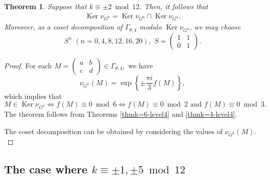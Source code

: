 \documentclass[12pt]{article}
\theoremstyle{definition}
\newtheorem{theorem}{Theorem}
\numberwithin{equation}{section}
\numberwithin{theorem}{section}
\newcommand{\Ker}{\operatorname{Ker}}
\begin{document}
\begin{theorem}
\label{thmk=2-level4}
{\it
Suppose that 
$k\equiv \pm2 \bmod{12}$. 
Then, it follows that 
\begin{align*}
\Ker \nu_{G^{k}}
=
\Ker 
\nu_{ G^{6} }
\cap
\Ker \nu_{ G^4 }. 
\end{align*}
Moreover, 
as a coset decomposition of $\Gamma_{\theta,4}$ modulo $\Ker \nu_{G^{k}}$,  
we may choose 
\begin{equation*}
S^{n}  \,\, 
(n=0,4,8,12,16,20),  \,\,
S=
\begin{pmatrix}
1 & 1 \\
0 & 1
\end{pmatrix}. 
\end{equation*}
}
\end{theorem}



\begin{proof}
For each 
$
M
=
\begin{pmatrix}
a & b \\
c & d
\end{pmatrix}
\in
\Gamma_{\theta,4}, 
$ 
we have 
\begin{equation*}
\nu_{G^{k}  }(M)=
\exp
\left\{
\pm
\frac{
 \pi i
}
{3} 
f(M) 
\right\},
\end{equation*}
which implies that 
\begin{equation*}
M
\in
\Ker \nu_{G^{k}}
\Longleftrightarrow 
f(M)\equiv 0 \bmod{6}
\Longleftrightarrow 
f(M)\equiv 0 \bmod{2} \,\,
\mathrm{and} \,\,
f(M)\equiv 0 \bmod{3}. 
\end{equation*}
The theorem follows from Theorems \ref{thmk=6-level4} and \ref{thmk=4-level4}.
\par
The coset decomposition can be obtained by considering the values of $\nu_{G^{k}  }(M).$
\end{proof}

















\subsection{The case where $k\equiv \pm 1, \pm 5 \bmod{12}$}
\end{document}
